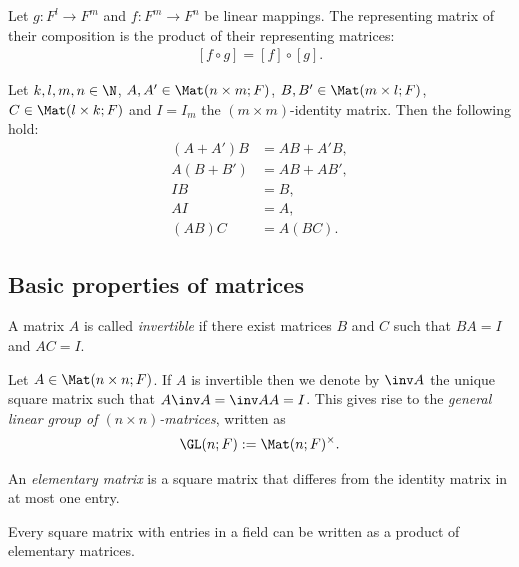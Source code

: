 \documentclass{article}
\begin{document}
\begin{theorem}[Notes 2.1.8]
	Let $g:F^l\to F^m$ and $f:F^m\to F^n$ be linear mappings. The representing matrix
	of their composition is the product of their representing matrices:
	\begin{align*}
		\left[f\circ g\right]=\left[f\right]\circ\left[g\right].
	\end{align*}
\end{theorem}

\begin{proposition}[Notes 2.1.9]
	Let $k,l,m,n\in\N$, $A,A'\in\Mat(n\times m;F)$, $B,B'\in\Mat(m\times l;F)$,
	$C\in\Mat(l\times k; F)$ and $I=I_m$ the $(m\times m)$-identity matrix.
	Then the following hold:
	\begin{align*}
		(A+A')B & = AB + A'B, \\
		A(B+B') & = AB + AB', \\
		IB      & = B,        \\
		AI      & = A,        \\
		(AB)C   & = A(BC).
	\end{align*}
\end{proposition}

\subsection{Basic properties of matrices}

\begin{definition}
	A matrix $A$ is called \emph{invertible} if there exist matrices $B$ and $C$
	such that $BA=I$ and $AC=I$.
\end{definition}

\begin{definition}
	Let $A\in\Mat(n\times n;F)$. If $A$ is invertible then we denote by $\inv A$
	the unique square matrix such that $A\inv A=\inv AA=I$. This gives rise to the
	\emph{general linear group of $(n\times n)$-matrices}, written as
	\begin{align*}
		\GL(n;F) := \Mat(n;F)^\times.
	\end{align*}
\end{definition}

\begin{definition}
	An \emph{elementary matrix} is a square matrix that differes from the identity
	matrix in at most one entry.
\end{definition}

\begin{theorem}[Notes 2.2.3]
	Every square matrix with entries in a field can be written as a product of
	elementary matrices.
\end{theorem}
\end{document}
